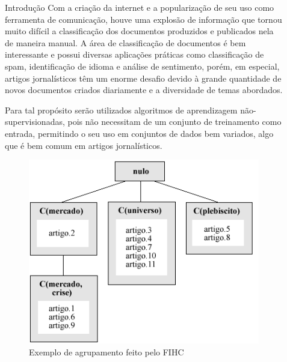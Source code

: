 \documentclass[final]{beamer}
\newlength{\sepwid}
\newlength{\onecolwid}
\newlength{\twocolwid}
\begin{document}
\begin{frame}[t]
\begin{columns}[t]
\begin{column}{\onecolwid}
\begin{block}{Introdução}
Com a criação da internet e a popularização de seu uso como ferramenta de comunicação, houve uma explosão de informação que tornou muito difícil a classificação dos documentos produzidos e publicados nela de maneira manual. A área de classificação de documentos é bem interessante e possui diversas aplicações práticas como classificação de spam, identificação de idioma e análise de sentimento, porém, em especial, artigos jornalísticos têm um enorme desafio devido à grande quantidade de novos documentos criados diariamente e a diversidade de temas abordados. %

Para tal propósito serão utilizados algoritmos de aprendizagem não-supervisionadas, pois não necessitam de um conjunto de treinamento como entrada, permitindo o seu uso em conjuntos de dados bem variados, algo que é bem comum em artigos jornalísticos.

\end{block}


\begin{figure}
\includegraphics[width=0.5\linewidth]{fihc.png}
\caption{Exemplo de agrupamento feito pelo FIHC}
\end{figure}


\end{column} %

\begin{column}{\sepwid}\end{column} %

\begin{column}{\twocolwid} %

\begin{columns}[t,totalwidth=\twocolwid] %


\end{columns}
\end{column}
\end{columns}
\end{frame}
\end{document}
